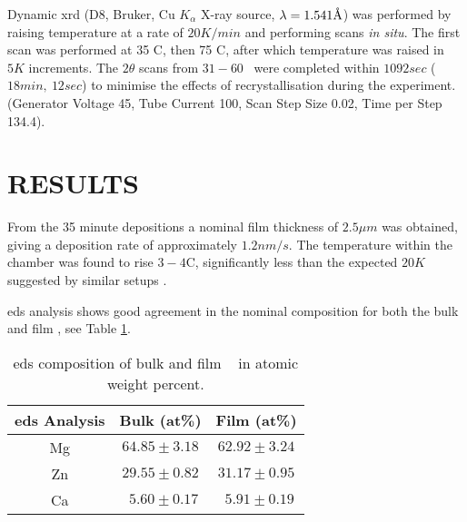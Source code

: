 \documentclass[a4paper,12pt,oneside]{article}%
\begin{document}
Dynamic \acrshort{xrd} (D8, Bruker, Cu $K_{\alpha}$ X-ray source, $\lambda = 1.541 \mbox{\normalfont\AA}$) was performed by raising temperature at a rate of $20 K/min$ and performing scans \textit{in situ}. The first scan was performed at 35 \degree C, then 75 \degree C, after which temperature was raised in $5K$ increments. The $2 \theta$ scans from $31 - 60$\degree~ were completed within $1092 sec$ ($18min,~ 12sec$) to minimise the effects of recrystallisation during the experiment. 
(Generator Voltage 45, Tube Current 100, Scan Step Size 0.02, Time per Step 134.4). 


\section{RESULTS}

From the 35 minute depositions a nominal film thickness of $2.5 \mu m$ was obtained, giving a deposition rate of approximately $1.2 nm/s$. The temperature within the chamber was found to rise $3 - 4$\degree C, significantly less than the expected $20K$ suggested by similar setups \cite{Wang2014}.

\acrshort{eds} analysis shows good agreement in the nominal composition for both the bulk and film \MgZnCa, see Table \ref{tab:EDS_Composition}.

\begin{table}[h]
	\centering
	\begin{tabular}{ c c c }
		\toprule
		\acrshort{eds} Analysis & Bulk (at\%)  & Film (at\%)  \\
		\midrule
		Mg & $64.85 \pm 3.18$ & $62.92 \pm 3.24$ \\
		Zn & $29.55 \pm 0.82$ & $31.17 \pm 0.95$ \\
		Ca & $~~ 5.60 \pm 0.17$ & $~~ 5.91 \pm 0.19$ \\ 
		\bottomrule
	\end{tabular}
	\caption{\acrshort{eds} composition of bulk and film \MgZnCa~ in atomic weight percent.}
	\label{tab:EDS_Composition}
\end{table}
\end{document}
